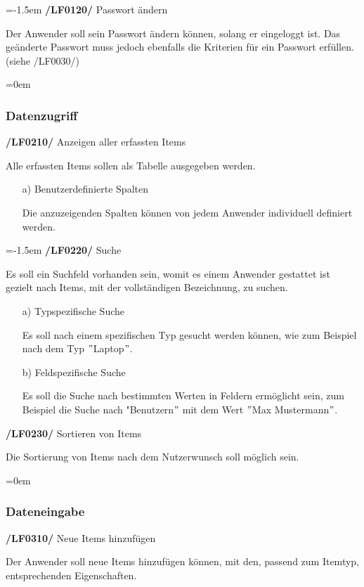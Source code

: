 \documentclass[11pt,a4paper]{report}
\begin{document}
\leftskip=-1.5em
\textbf{/LF0120/} Passwort ändern
\par
\begingroup
\leftskip=1cm
\noindent Der Anwender soll sein Passwort ändern können, solang er eingeloggt ist.
Das geänderte Passwort muss jedoch ebenfalls die Kriterien für ein Passwort erfüllen.
(siehe /LF0030/)\\
\par
\endgroup

\leftskip=0em
\subsubsection{Datenzugriff}
\textbf{/LF0210/} Anzeigen aller erfassten Items
\par
\begingroup
\leftskip=1cm
\noindent Alle erfassten Items sollen als Tabelle ausgegeben werden.
\begin{enumerate}
\leftskip=3em
\item[a)] Benutzerdefinierte Spalten
\item[] Die anzuzeigenden Spalten können von jedem Anwender individuell definiert werden.
\end{enumerate}
\par
\endgroup

\leftskip=-1.5em
\textbf{/LF0220/} Suche
\par
\begingroup
\leftskip=1cm
\noindent Es soll ein Suchfeld vorhanden sein, womit es einem Anwender gestattet ist gezielt nach Items, mit der vollständigen Bezeichnung, zu suchen.
\begin{enumerate}
\leftskip=3em
\item[a)] Typspezifische Suche
\item[] Es soll nach einem spezifischen Typ gesucht werden können, wie zum Beispiel nach dem Typ $"$Laptop$"$.
\item[b)]Feldspezifische Suche
\item[] Es soll die Suche nach bestimmten Werten in Feldern ermöglicht sein, zum Beispiel die Suche nach "Benutzern$"$ mit dem Wert $"$Max Mustermann$"$.
\end{enumerate}
\par
\endgroup

\textbf{/LF0230/} Sortieren von Items
\par
\begingroup
\leftskip=1cm
\noindent Die Sortierung von Items nach dem Nutzerwunsch soll möglich sein.\\
\par
\endgroup

\leftskip=0em
\subsubsection{Dateneingabe}
\textbf{/LF0310/} Neue Items hinzufügen
\par
\begingroup
\leftskip=1cm
\noindent Der Anwender soll neue Items hinzufügen können, mit den, passend zum Itemtyp, entsprechenden Eigenschaften.\\
\par
\endgroup
\end{document}
